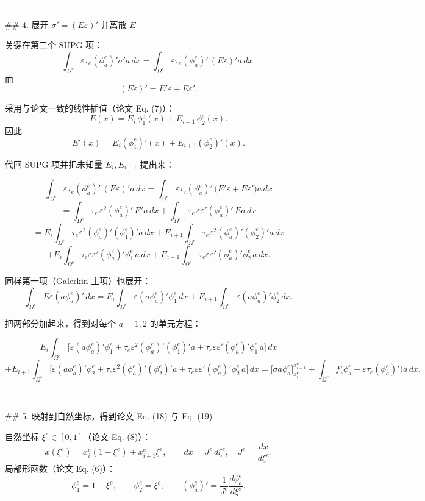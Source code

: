 ---

## 4. 展开 \(\sigma'=(E\varepsilon)'\) 并离散 \(E\)

关键在第二个 SUPG 项：
\[
\int_{\Omega^e}\varepsilon\tau_e(\phi_a^e)'\sigma' a\,dx
=
\int_{\Omega^e}\varepsilon\tau_e(\phi_a^e)'\,(E\varepsilon)' a\,dx.
\]
而
\[
(E\varepsilon)'=E'\varepsilon+E\varepsilon'.
\]

采用与论文一致的线性插值（论文 Eq. (7)）：
\[
E(x)=E_i\,\phi_1^e(x)+E_{i+1}\,\phi_2^e(x).
\]
因此
\[
E'(x)=E_i(\phi_1^e)'(x)+E_{i+1}(\phi_2^e)'(x).
\]

代回 SUPG 项并把未知量 \(E_i,E_{i+1}\) 提出来：

\[
\int_{\Omega^e}\varepsilon\tau_e(\phi_a^e)'\,(E\varepsilon)' a\,dx
=
\int_{\Omega^e}\varepsilon\tau_e(\phi_a^e)'\,
\Big(E'\varepsilon+E\varepsilon'\Big)a\,dx
\]
\[
=
\int_{\Omega^e}\tau_e\,\varepsilon^2(\phi_a^e)'\,E' a\,dx
+\int_{\Omega^e}\tau_e\,\varepsilon\varepsilon'(\phi_a^e)'\,E a\,dx
\]
\[
=
E_i\int_{\Omega^e}\tau_e\varepsilon^2(\phi_a^e)'(\phi_1^e)'a\,dx
+
E_{i+1}\int_{\Omega^e}\tau_e\varepsilon^2(\phi_a^e)'(\phi_2^e)'a\,dx
\]
\[
+
E_i\int_{\Omega^e}\tau_e\varepsilon\varepsilon'(\phi_a^e)'\phi_1^e\,a\,dx
+
E_{i+1}\int_{\Omega^e}\tau_e\varepsilon\varepsilon'(\phi_a^e)'\phi_2^e\,a\,dx.
\]

同样第一项（Galerkin 主项）也展开：
\[
\int_{\Omega^e}E\varepsilon(a\phi_a^e)'\,dx
=
E_i\int_{\Omega^e}\varepsilon(a\phi_a^e)'\phi_1^e\,dx
+
E_{i+1}\int_{\Omega^e}\varepsilon(a\phi_a^e)'\phi_2^e\,dx.
\]

把两部分加起来，得到对每个 \(a=1,2\) 的单元方程：

\[
E_i\int_{\Omega^e}\Big[
\varepsilon(a\phi_a^e)'\phi_1^e
+\tau_e\varepsilon^2(\phi_a^e)'(\phi_1^e)'a
+\tau_e\varepsilon\varepsilon'(\phi_a^e)'\phi_1^e\,a
\Big]\,dx
\]
\[
+
E_{i+1}\int_{\Omega^e}\Big[
\varepsilon(a\phi_a^e)'\phi_2^e
+\tau_e\varepsilon^2(\phi_a^e)'(\phi_2^e)'a
+\tau_e\varepsilon\varepsilon'(\phi_a^e)'\phi_2^e\,a
\Big]\,dx
=
\Big[\sigma a\phi_a^e\Big]_{x_i^e}^{x_{i+1}^e}
+\int_{\Omega^e}f\Big(\phi_a^e-\varepsilon\tau_e(\phi_a^e)'\Big)a\,dx.
\]

---

## 5. 映射到自然坐标，得到论文 Eq. (18) 与 Eq. (19)

自然坐标 \(\xi^e\in[0,1]\)（论文 Eq. (8)）：
\[
x(\xi^e)=x_i^e(1-\xi^e)+x_{i+1}^e\xi^e,\qquad
dx=J^e\,d\xi^e,\quad J^e=\frac{dx}{d\xi^e}.
\]
局部形函数（论文 Eq. (6)）：
\[
\phi_1^e=1-\xi^e,\qquad \phi_2^e=\xi^e,
\qquad (\phi_a^e)'=\frac{1}{J^e}\frac{d\phi_a^e}{d\xi^e}.
\]

